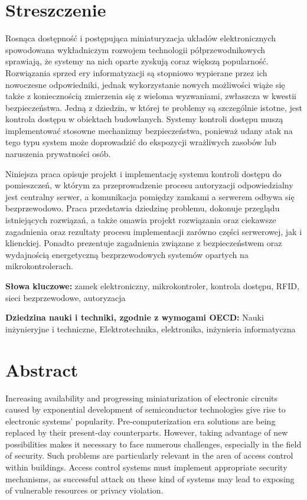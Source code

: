 \section*{Streszczenie}

	Rosnąca dostępność i postępująca miniaturyzacja układów elektronicznych spowodowana wykładniczym rozwojem technologii półprzewodnikowych sprawiają, że systemy na nich oparte zyskują coraz większą popularność. Rozwiązania sprzed ery informatyzacji są stopniowo wypierane przez ich nowoczesne odpowiedniki, jednak wykorzystanie nowych możliwości wiąże się także z koniecznością zmierzenia się z wieloma wyzwaniami, zwłaszcza w kwestii bezpieczeństwa. Jedną z dziedzin, w której te problemy są szczególnie istotne, jest kontrola dostępu w obiektach budowlanych. Systemy kontroli dostępu muszą implementować stosowne mechanizmy bezpieczeństwa, ponieważ udany atak na tego typu system może doprowadzić do ekspozycji wrażliwych zasobów lub naruszenia prywatności osób.

	Niniejsza praca opisuje projekt i implementację systemu kontroli dostępu do pomieszczeń, w którym za przeprowadzenie procesu autoryzacji odpowiedzialny jest centralny serwer, a komunikacja pomiędzy zamkami a serwerem odbywa się bezprzewodowo. Praca przedstawia dziedzinę problemu, dokonuje przeglądu istniejących rozwiązań, a także omawia projekt rozwiązania oraz ciekawsze zagadnienia oraz rezultaty procesu implementacji zarówno części serwerowej, jak i klienckiej. Ponadto prezentuje zagadnienia związane z bezpieczeństwem oraz wydajnością energetyczną bezprzewodowych systemów opartych na mikrokontrolerach.

	\textbf{Słowa kluczowe:} zamek elektroniczny, mikrokontroler, kontrola dostępu, RFID, sieci bezprzewodowe, autoryzacja

	\textbf{Dziedzina nauki i techniki, zgodnie z wymogami OECD:} Nauki inżynieryjne i techniczne, Elektrotechnika, elektronika, inżynieria informatyczna

\newpage

\section*{Abstract}

	Increasing availability and progressing miniaturization of electronic circuits caused by exponential development of semiconductor technologies give rise to electronic systems' popularity. Pre-computerization era solutions are being replaced by their present-day counterparts. However, taking advantage of new possibilities makes it necessary to face numerous challenges, especially in the field of security. Such problems are particularly relevant in the area of access control within buildings. Access control systems must implement appropriate security mechanisms, as successful attack on these kind of systems may lead to exposing of vulnerable resources or privacy violation.

